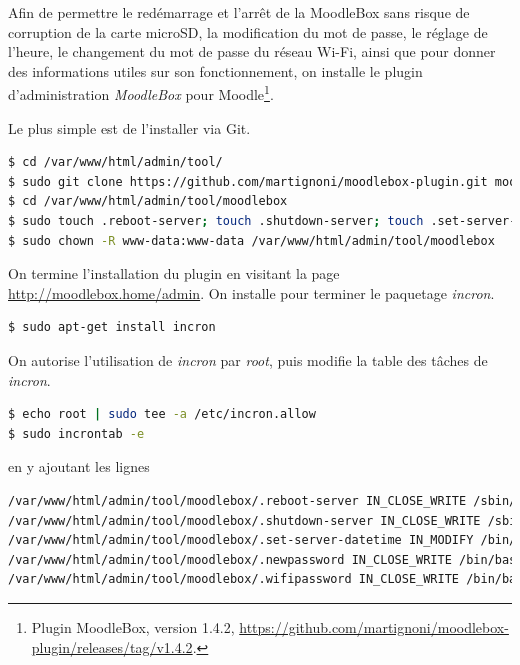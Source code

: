 \documentclass[11pt]{article}
\begin{document}
Afin de permettre le redémarrage et l'arrêt de la MoodleBox sans risque de corruption de la carte microSD, la modification du mot de passe, le réglage de l'heure, le changement du mot de passe du réseau Wi-Fi, ainsi que pour donner des informations utiles sur son fonctionnement, on installe le plugin d'administration \emph{MoodleBox} pour Moodle\footnote{Plugin MoodleBox, version 1.4.2, \url{https://github.com/martignoni/moodlebox-plugin/releases/tag/v1.4.2}.}.

Le plus simple est de l'installer via Git.

\begin{lstlisting}[language=bash]
$ cd /var/www/html/admin/tool/
$ sudo git clone https://github.com/martignoni/moodlebox-plugin.git moodlebox
$ cd /var/www/html/admin/tool/moodlebox
$ sudo touch .reboot-server; touch .shutdown-server; touch .set-server-datetime; touch .newpassword; touch .wifipassword
$ sudo chown -R www-data:www-data /var/www/html/admin/tool/moodlebox
\end{lstlisting}

On termine l'installation du plugin en visitant la page \url{http://moodlebox.home/admin}. On installe pour terminer le paquetage \emph{incron}.

\begin{lstlisting}[language=bash]
$ sudo apt-get install incron
\end{lstlisting}

On autorise l'utilisation de \emph{incron} par \emph{root}, puis modifie la table des tâches de \emph{incron}.

\begin{lstlisting}[language=bash]
$ echo root | sudo tee -a /etc/incron.allow
$ sudo incrontab -e
\end{lstlisting}

en y ajoutant les lignes
\begin{lstlisting}[language=bash]
/var/www/html/admin/tool/moodlebox/.reboot-server IN_CLOSE_WRITE /sbin/shutdown -r now
/var/www/html/admin/tool/moodlebox/.shutdown-server IN_CLOSE_WRITE /sbin/shutdown -h now
/var/www/html/admin/tool/moodlebox/.set-server-datetime IN_MODIFY /bin/bash /var/www/html/admin/tool/moodlebox/.set-server-datetime
/var/www/html/admin/tool/moodlebox/.newpassword IN_CLOSE_WRITE /bin/bash /var/www/html/admin/tool/moodlebox/bin/changepassword.sh
/var/www/html/admin/tool/moodlebox/.wifipassword IN_CLOSE_WRITE /bin/bash /var/www/html/admin/tool/moodlebox/bin/setwifipassword.sh
\end{lstlisting}
\end{document}
